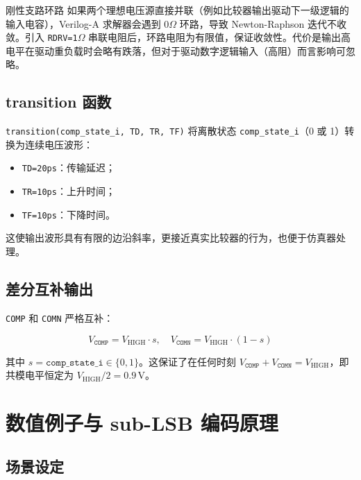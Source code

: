 \documentclass[UTF8,a4paper,11pt]{ctexart}
\newcommand{\code}[1]{\texttt{#1}}
\begin{document}
\begin{notebox}{刚性支路环路}
如果两个理想电压源直接并联（例如比较器输出驱动下一级逻辑的输入电容），Verilog-A 求解器会遇到 $0\Omega$ 环路，导致 Newton-Raphson 迭代不收敛。引入 \code{RDRV=1$\Omega$} 串联电阻后，环路电阻为有限值，保证收敛性。代价是输出高电平在驱动重负载时会略有跌落，但对于驱动数字逻辑输入（高阻）而言影响可忽略。
\end{notebox}

\subsection{transition 函数}

\code{transition(comp\_state\_i, TD, TR, TF)} 将离散状态 \code{comp\_state\_i}（0 或 1）转换为连续电压波形：

\begin{itemize}[leftmargin=2em]
    \item \code{TD=20ps}：传输延迟；
    \item \code{TR=10ps}：上升时间；
    \item \code{TF=10ps}：下降时间。
\end{itemize}

这使输出波形具有有限的边沿斜率，更接近真实比较器的行为，也便于仿真器处理。

\subsection{差分互补输出}

\code{COMP} 和 \code{COMN} 严格互补：

\begin{equation}
V_{\code{COMP}} = V_{\mathrm{HIGH}} \cdot s, \quad V_{\code{COMN}} = V_{\mathrm{HIGH}} \cdot (1-s)
\end{equation}

其中 $s = \code{comp\_state\_i} \in \{0, 1\}$。这保证了在任何时刻 $V_{\code{COMP}} + V_{\code{COMN}} = V_{\mathrm{HIGH}}$，即共模电平恒定为 $V_{\mathrm{HIGH}}/2 = 0.9\,\mathrm{V}$。

\section{数值例子与 sub-LSB 编码原理}

\subsection{场景设定}
\end{document}
